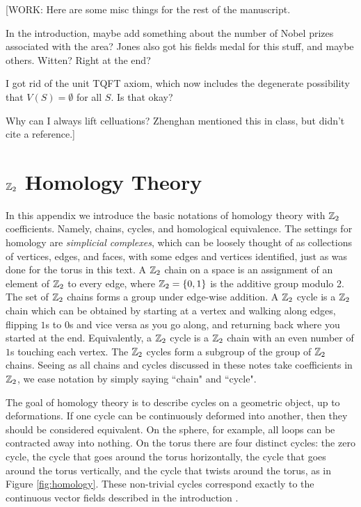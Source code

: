 \documentclass{article}
\theoremstyle{definition}
\numberwithin{figure}{section}
\begin{document}
[WORK: Here are some misc things for the rest of the manuscript.

In the introduction, maybe add something about the number of Nobel prizes associated with the area? Jones also got his fields medal for this stuff, and maybe others. Witten? Right at the end?

I got rid of the unit TQFT axiom, which now includes the degenerate possibility that $V(S)=\emptyset$ for all $S$. Is that okay?

Why can I always lift celluations? Zhenghan mentioned this in class, but didn't cite a reference.]
\appendix

\section{$\mathbb{Z}_2$ Homology Theory}
\label{Homology}

In this appendix we introduce the basic notations of homology theory with $\mathbb{Z}_2$ coefficients. Namely, chains, cycles, and homological equivalence. The settings for homology are \textit{simplicial complexes}, which can be loosely thought of as collections of vertices, edges, and faces, with some edges and vertices identified, just as was done for the torus in this text. A $\mathbb{Z}_2$ chain on a space is an assignment of an element of $\mathbb{Z}_2$ to every edge, where $\mathbb{Z}_2=\{0,1\}$ is the additive group modulo 2. The set of $\mathbb{Z}_2$ chains forms a group under edge-wise addition. A $\mathbb{Z}_2$ cycle is a $\mathbb{Z}_2$ chain which can be obtained by starting at a vertex and walking along edges, flipping $1$s to $0$s and vice versa as you go along, and returning back where you started at the end. Equivalently, a $\mathbb{Z}_2$ cycle is a $\mathbb{Z}_2$ chain with an even number of $1$s touching each vertex. The $\mathbb{Z}_2$ cycles form a subgroup of the group of $\mathbb{Z}_2$ chains. Seeing as all chains and cycles discussed in these notes take coefficients in $\mathbb{Z}_2$, we ease notation by simply saying ``chain" and ``cycle".

The goal of homology theory is to describe cycles on a geometric object, up to deformations. If one cycle can be continuously deformed into another, then they should be considered equivalent. On the sphere, for example, all loops can be contracted away into nothing. On the torus there are four distinct cycles: the zero cycle, the cycle that goes around the torus horizontally, the cycle that goes around the torus vertically, and the cycle that twists around the torus, as in Figure \ref{fig:homology}. These non-trivial cycles correspond exactly to the continuous vector fields described in the introduction \cite{frankel1957homology}.
\end{document}

